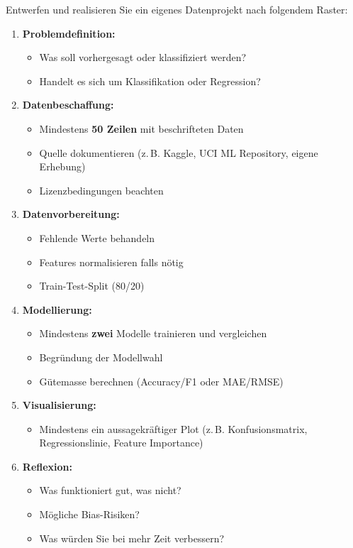 \begin{myexercise}
Entwerfen und realisieren Sie ein eigenes Datenprojekt nach folgendem Raster:

\begin{enumerate}
    \item \textbf{Problemdefinition:}
    \begin{itemize}
        \item Was soll vorhergesagt oder klassifiziert werden?
        \item Handelt es sich um Klassifikation oder Regression?
    \end{itemize}

    \item \textbf{Datenbeschaffung:}
    \begin{itemize}
        \item Mindestens \textbf{50 Zeilen} mit beschrifteten Daten
        \item Quelle dokumentieren (z.\,B. Kaggle, UCI ML Repository, eigene Erhebung)
        \item Lizenzbedingungen beachten
    \end{itemize}

    \item \textbf{Datenvorbereitung:}
    \begin{itemize}
        \item Fehlende Werte behandeln
        \item Features normalisieren falls nötig
        \item Train-Test-Split (80/20)
    \end{itemize}

    \item \textbf{Modellierung:}
    \begin{itemize}
        \item Mindestens \textbf{zwei} Modelle trainieren und vergleichen
        \item Begründung der Modellwahl
        \item Gütemasse berechnen (Accuracy/F1 oder MAE/RMSE)
    \end{itemize}

    \item \textbf{Visualisierung:}
    \begin{itemize}
        \item Mindestens ein aussagekräftiger Plot (z.\,B. Konfusionsmatrix, Regressionslinie,
              Feature Importance)
    \end{itemize}

    \item \textbf{Reflexion:}
    \begin{itemize}
        \item Was funktioniert gut, was nicht?
        \item Mögliche Bias-Risiken?
        \item Was würden Sie bei mehr Zeit verbessern?
    \end{itemize}
\end{enumerate}
\end{myexercise}

